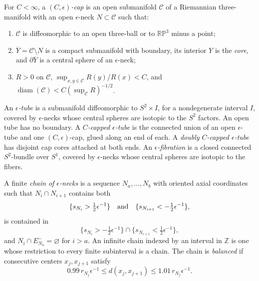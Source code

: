 \begin{definition}
\label{def:canonical-cap}
\notready
For $C<\infty$, a \emph{$(C,\epsilon)$-cap} is an open submanifold
$\mathcal C$ of a Riemannian three-manifold with an open
$\epsilon$-neck $N\subset\mathcal C$ such that:
\begin{enumerate}
\item $\mathcal C$ is diffeomorphic to an open three-ball or to
      $\mathbb{RP}^3$ minus a point;
\item $\overline Y=\mathcal C\setminus N$ is a compact submanifold with
      boundary, its interior $Y$ is the \emph{core}, and
      $\partial\overline Y$ is a central sphere of an $\epsilon$-neck;
\item $R>0$ on $\mathcal C$,
      $\sup_{x,y\in\mathcal C}R(y)/R(x)<C$, and
      $\operatorname{diam}(\mathcal C)
       <C(\sup_{\mathcal C}R)^{-1/2}$.
\end{enumerate}
\end{definition}

\begin{definition}
\label{def:canonical-neck-cap-regions}
\notready
An \emph{$\epsilon$-tube} is a submanifold diffeomorphic to
$S^2\times I$, for a nondegenerate interval $I$, covered by
$\epsilon$-necks whose central spheres are isotopic to the $S^2$ factors.
An open tube has no boundary.  A \emph{$C$-capped $\epsilon$-tube} is the
connected union of an open $\epsilon$-tube and one $(C,\epsilon)$-cap,
glued along an end of each.  A \emph{doubly $C$-capped
$\epsilon$-tube} has disjoint cap cores attached at both ends.  An
\emph{$\epsilon$-fibration} is a closed connected $S^2$-bundle over
$S^1$, covered by $\epsilon$-necks whose central spheres are isotopic to
the fibers.
\end{definition}

\begin{definition}
\label{def:balanced-neck-chain}
\notready
A finite \emph{chain of $\epsilon$-necks} is a sequence
$N_a,\ldots,N_b$ with oriented axial coordinates such that
$N_i\cap N_{i+1}$ contains both
\[
 \{s_{N_i}>\tfrac12\epsilon^{-1}\}
 \quad\hbox{and}\quad
 \{s_{N_{i+1}}<-\tfrac12\epsilon^{-1}\},
\]
is contained in
\[
 \{s_{N_i}>-\tfrac12\epsilon^{-1}\}
 \cap
 \{s_{N_{i+1}}<\tfrac12\epsilon^{-1}\},
\]
and $N_i\cap E_{N_a}^-=\varnothing$ for $i>a$.  An infinite chain indexed
by an interval in $\mathbb Z$ is one whose restriction to every finite
subinterval is a chain.  The chain is \emph{balanced} if consecutive
centers $x_j,x_{j+1}$ satisfy
\[
 0.99\,r_{N_j}\epsilon^{-1}
 \le d(x_j,x_{j+1})
 \le1.01\,r_{N_j}\epsilon^{-1}.
\]
\end{definition}

